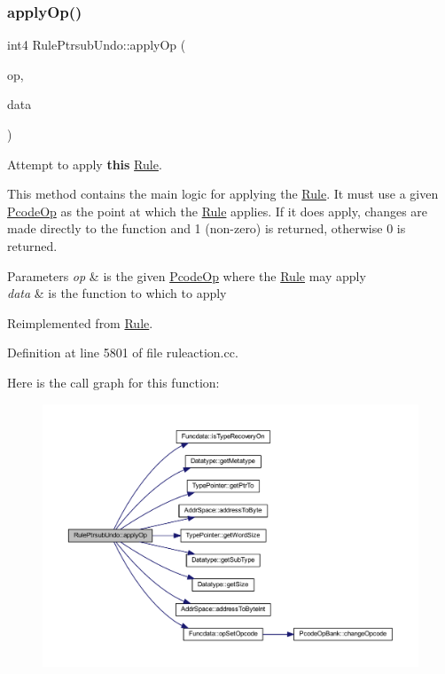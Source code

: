 \subsubsection{\texorpdfstring{applyOp()}{applyOp()}}
{\footnotesize\ttfamily int4 Rule\+Ptrsub\+Undo\+::apply\+Op (\begin{DoxyParamCaption}\item[{\mbox{\hyperlink{class_pcode_op}{Pcode\+Op}} $\ast$}]{op,  }\item[{\mbox{\hyperlink{class_funcdata}{Funcdata}} \&}]{data }\end{DoxyParamCaption})\hspace{0.3cm}{\ttfamily [virtual]}}



Attempt to apply {\bfseries{this}} \mbox{\hyperlink{class_rule}{Rule}}. 

This method contains the main logic for applying the \mbox{\hyperlink{class_rule}{Rule}}. It must use a given \mbox{\hyperlink{class_pcode_op}{Pcode\+Op}} as the point at which the \mbox{\hyperlink{class_rule}{Rule}} applies. If it does apply, changes are made directly to the function and 1 (non-\/zero) is returned, otherwise 0 is returned. 
\begin{DoxyParams}{Parameters}
{\em op} & is the given \mbox{\hyperlink{class_pcode_op}{Pcode\+Op}} where the \mbox{\hyperlink{class_rule}{Rule}} may apply \\
\hline
{\em data} & is the function to which to apply \\
\hline
\end{DoxyParams}


Reimplemented from \mbox{\hyperlink{class_rule_a4e3e61f066670175009f60fb9dc60848}{Rule}}.



Definition at line 5801 of file ruleaction.\+cc.

Here is the call graph for this function\+:
\nopagebreak
\begin{figure}[H]
\begin{center}
\leavevmode
\includegraphics[width=350pt]{class_rule_ptrsub_undo_abba2872c347b72aab45c05d4a674d555_cgraph}
\end{center}
\end{figure}
\mbox{\label{class_rule_ptrsub_undo_a43d93ec61cd150a0cadb4752667558b1}} 
